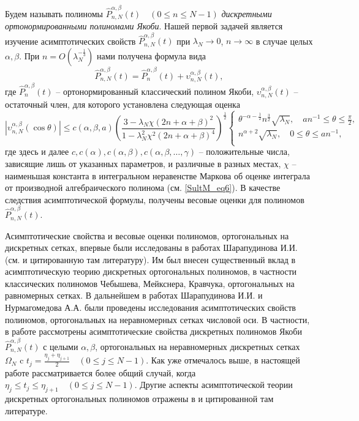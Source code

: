 Будем называть полиномы $\hat{P}_{n,N}^{\alpha,\beta}(t) \quad (0 \leq n \leq N-1)$ \textit{дискретными ортонормированными полиномами Якоби}. Нашей первой задачей является изучение асимптотических свойств $\hat{P}_{n,N}^{\alpha,\beta}(t)$ при $\lambda_N \rightarrow 0$, $n \rightarrow \infty$ в случае целых $\alpha,\beta$. При $n = O(\lambda_N^{-\frac{1}{3}})$ нами получена формула вида
\begin{equation*}
\hat{P}_{n,N}^{\alpha,\beta}(t) = \hat{P}_{n}^{\alpha,\beta}(t) + \upsilon_{n,N}^{\alpha,\beta}(t),
\end{equation*}
где $\hat{P}_{n}^{\alpha,\beta}(t)$ -- ортонормированный классический полином Якоби, $\upsilon_{n,N}^{\alpha,\beta}(t)$ -- остаточный член,  для которого установлена следующая оценка
\begin{equation*}
\left|\upsilon_{n,N}^{\alpha,\beta}(\cos{\theta})\right| \leq
c(\alpha,\beta,a) \left( \frac{3-\lambda_N \chi (2n+\alpha+\beta)^2}{1-\lambda_N^2 \chi^2 (2n+\alpha+\beta)^4} \right)^{\frac{1}{2}}
\left\{
\begin{aligned}
\theta^{-\alpha-\frac{1}{2}}n^{\frac{3}{2}}\sqrt{\lambda_N},\quad an^{-1}\leq\theta\leq \frac{\pi}{2},\\
n^{\alpha+2}\sqrt{\lambda_N},\quad 0\leq\theta\leq an^{-1},\\
\end{aligned}
\right.
\end{equation*}
где здесь и далее $c, c(\alpha), c(\alpha,\beta), c(\alpha,\beta,\ldots,\gamma)$ -- положительные числа, зависящие лишь от указанных параметров, и различные в разных местах,  $\chi$ -- наименьшая константа в интегральном неравенстве Маркова  об оценке интеграла от производной алгебраического полинома (см. \eqref{SultM_eq6}).  В качестве следствия асимптотической формулы, получены весовые оценки для полиномов $\hat{P}_{n,N}^{\alpha,\beta}(t)$.

Асимптотические свойства и весовые оценки полиномов, ортогональных на дискретных сетках, впервые были исследованы в работах Шарапудинова И.И. (см. \cite{idprmgreenBook} и цитированную там литературу). Им
был внесен существенный вклад в асимптотическую теорию дискретных ортогональных полиномов, в частности классических полиномов Чебышева, Мейкснера, Кравчука, ортогональных на равномерных сетках. В дальнейшем в работах Шарапудинова И.И. \cite{nushii2,nushii3,nushii4} и Нурмагомедова А.А. \cite{nunurik1, nunurik2} были проведены исследования асимптотических свойств полиномов, ортогональных на неравномерных сетках числовой оси. В частности, в работе \cite{nunurik2} рассмотрены асимптотические свойства дискретных полиномов Якоби $\hat{P}_{n,N}^{\alpha,\beta}(t)$ с целыми $\alpha,\beta$, ортогональных на неравномерных дискретных сетках $\Omega_N$ c
$t_{j} = \frac{\eta_{j}+\eta_{j+1}}{2} \quad (0\leq j \leq N-1)$.
Как уже отмечалось выше, в настоящей работе рассматривается более общий случай, когда $\eta_{j}\leq t_{j} \leq \eta_{j+1} \quad (0\leq j \leq N-1)$.
Другие аспекты асимптотической теории дискретных ортогональных полиномов отражены в \cite{mcbaik,ouwong,lopezsinus} и цитированной там литературе.

